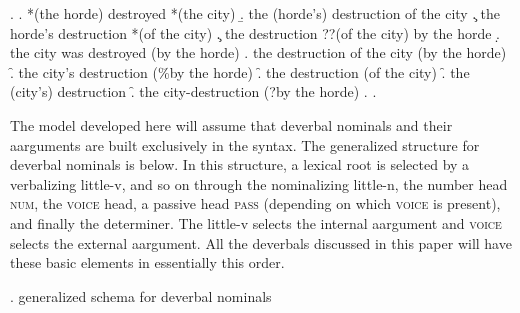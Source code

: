 \documentclass[12pt]{article}
\newcommand*{\textsub}[1]{\ensuremath{_\textrm{{\scriptsize #1}}}}
\begin{document}
\singlespacing

\ex. \label{introdata}
\a. *(the horde) destroyed *(the city)
\b. the (horde's) destruction of the city
\c. the horde's destruction *(of the city)
\c. the destruction ??(of the city) by the horde
\d. the city was destroyed (by the horde)
\e. \label{intro1} the destruction of the city (by the horde)
\f. the city's destruction (\%by the horde)
\f. the destruction (of the city)
\f. the (city's) destruction
\f. the city-destruction (?by the horde)
\z. \z. \par

\doublespacing

The model developed here will assume that deverbal nominals and their aarguments are built exclusively in the syntax. The generalized structure for deverbal nominals is below. In this structure, a lexical root is selected by a verbalizing little-v, and so on through the nominalizing little-n, the number head \textsc{num}, the \textsc{voice} head, a passive head \textsc{pass} (depending on which \textsc{voice} is present), and finally the determiner. The little-v selects the internal aargument and \textsc{voice} selects the external aargument. All the deverbals discussed in this paper will have these basic elements in essentially this order.

\singlespacing

\ex. \label{schema} generalized schema for deverbal nominals

\vspace*{-10pt}
\par \hfill \par
\doublespacing
\end{document}
